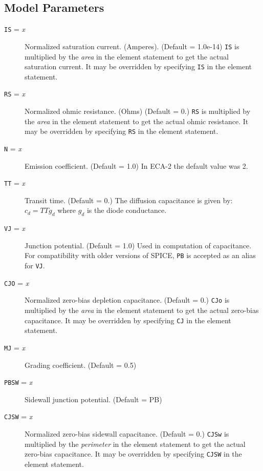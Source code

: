 \subsection{Model Parameters}

\begin{description}
  
\item[{\tt IS} = {\it x}] Normalized saturation current. (Amperes).
  (Default = 1.0e-14) {\tt IS} is multiplied by the {\it area} in the
  element statement to get the actual saturation current.  It may be
  overridden by specifying {\tt IS} in the element statement.
  
\item[{\tt RS} = {\it x}] Normalized ohmic resistance. (Ohms) (Default
  = 0.)  {\tt RS} is multiplied by the {\it area} in the element
  statement to get the actual ohmic resistance.  It may be overridden
  by specifying {\tt RS} in the element statement.
  
\item[{\tt N} = {\it x}] Emission coefficient. (Default = 1.0) In
  ECA-2 the default value was 2.
  
\item[{\tt TT} = {\it x}] Transit time. (Default = 0.)  The diffusion
  capacitance is given by: $c_d = TT g_d$ where $g_d$ is the diode
  conductance.
  
\item[{\tt VJ} = {\it x}] Junction potential.  (Default = 1.0) Used in
  computation of capacitance.  For compatibility with older versions
  of SPICE, {\tt PB} is accepted as an alias for {\tt VJ}.

\item[{\tt CJO} = {\it x}] Normalized zero-bias depletion capacitance.
  (Default = 0.)  {\tt CJo} is multiplied by the {\it area} in the
  element statement to get the actual zero-bias capacitance.  It may
  be overridden by specifying {\tt CJ} in the element statement.
  
\item[{\tt MJ} = {\it x}] Grading coefficient.  (Default = 0.5)
  
\item[{\tt PBSW} = {\it x}] Sidewall junction potential.  (Default =
  PB)
  
\item[{\tt CJSW} = {\it x}] Normalized zero-bias sidewall capacitance.
  (Default = 0.)  {\tt CJSw} is multiplied by the {\it perimeter} in
  the element statement to get the actual zero-bias capacitance.  It
  may be overridden by specifying {\tt CJSW} in the element statement.
  

\end{description}
